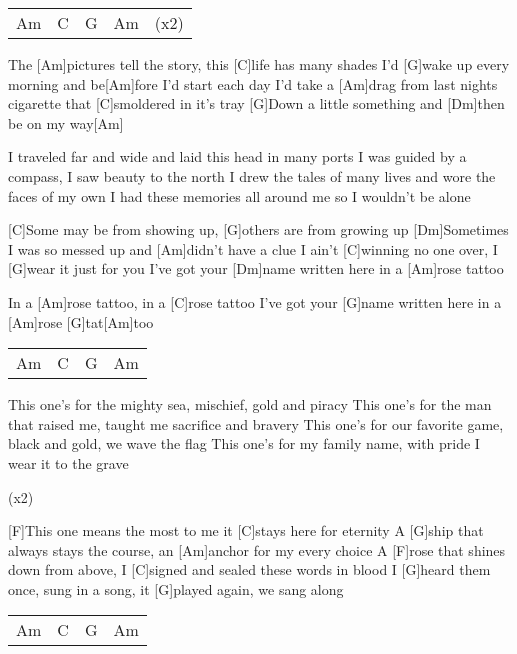 \begin{guitar}
	{\footnotesize\begin{tabular}{l|l|l|l l}
			Am & C & G & Am & (x2)
	\end{tabular}}

	The [Am]pictures tell the story, this [C]life has many shades
	I’d [G]wake up every morning and be[Am]fore I’d start each day
	I’d take a [Am]drag from last nights cigarette that [C]smoldered in it’s tray
	[G]Down a little something and [Dm]then be on my way[Am]{}
	
	I traveled far and wide and laid this head in many ports
	I was guided by a compass, I saw beauty to the north
	I drew the tales of many lives and wore the faces of my own 
	I had these memories all around me so I wouldn’t be alone
	
	[C]Some may be from showing up, [G]others are from growing up
	[Dm]Sometimes I was so messed up and [Am]didn’t have a clue
	I ain’t [C]winning no one over, I [G]wear it just for you
	I’ve got your [Dm]name written here in a [Am]rose tattoo
	
	In a [Am]rose tattoo, in a [C]rose tattoo
	I’ve got your [G]name written here in a [Am]rose [G]tat[Am]too
	
	{\footnotesize\begin{tabular}{l|l|l|l}
			Am & C & G & Am
	\end{tabular}}

	This one's for the mighty sea, mischief, gold and piracy
	This one's for the man that raised me, taught me sacrifice and bravery
	This one's for our favorite game, black and gold, we wave the flag
	This one's for my family name, with pride I wear it to the grave
	
	 
	
	  (x2)
	
	\pagebreak
	
	[F]This one means the most to me it [C]stays here for eternity
	A [G]ship that always stays the course, an [Am]anchor for my every choice
	A [F]rose that shines down from above, I [C]signed and sealed these words in blood
	I [G]heard them once, sung in a song, it [G]played again, we sang along
	
	{\footnotesize\begin{tabular}{l|l|l|l}
			Am & C & G & Am
	\end{tabular}}
	

\end{guitar}
